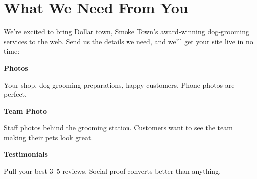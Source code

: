 \documentclass[11pt,letterpaper]{article}
\begin{document}
\vspace{0.2em}

\section*{What We Need From You}

We’re excited to bring Dollar town, Smoke Town’s award‑winning dog‑grooming services to the web. Send us the details we need, and we’ll get your site live in no time:

\vspace{0.12em}

\noindent\begin{minipage}[t]{0.48\textwidth}
\begin{tcolorbox}[colframe=accent-teal, boxrule=1pt, left=0.7em, right=0.7em, top=0.5em, bottom=0.5em, arc=4pt, boxsep=0pt]
{\bfseries\small\color{accent-teal}Photos}

\vspace{0.15em}

{\small Your shop, dog grooming preparations, happy customers. Phone photos are perfect.}
\end{tcolorbox}

\vspace{0.1em}

\begin{tcolorbox}[colframe=accent-teal, boxrule=1pt, left=0.7em, right=0.7em, top=0.5em, bottom=0.5em, arc=4pt, boxsep=0pt]
{\bfseries\small\color{accent-teal}Team Photo}

\vspace{0.15em}

{\small Staff photos behind the grooming station. Customers want to see the team making their pets look great.}
\end{tcolorbox}

\vspace{0.1em}

\begin{tcolorbox}[colframe=accent-teal, boxrule=1pt, left=0.7em, right=0.7em, top=0.5em, bottom=0.5em, arc=4pt, boxsep=0pt]
{\bfseries\small\color{accent-teal}Testimonials}

\vspace{0.15em}

{\small Pull your best 3--5 reviews. Social proof converts better than anything.}
\end{tcolorbox}
\end{minipage}
\hfill
\end{document}
